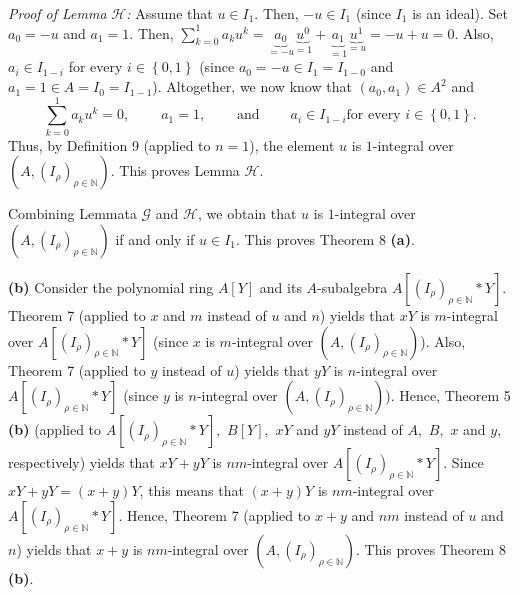 \documentclass[12pt,final,notitlepage,onecolumn]{article}%
\begin{document}
\textit{Proof of Lemma }$\mathcal{H}$\textit{:} Assume that $u\in I_{1}$.
Then, $-u\in I_{1}$ (since $I_{1}$ is an ideal). Set $a_{0}=-u$ and $a_{1}=1$.
Then, $\sum\limits_{k=0}^{1}a_{k}u^{k}=\underbrace{a_{0}}_{=-u}\underbrace
{u^{0}}_{=1}+\underbrace{a_{1}}_{=1}\underbrace{u^{1}}_{=u}=-u+u=0$. Also,
$a_{i}\in I_{1-i}$ for every $i\in\left\{  0,1\right\}  $ (since $a_{0}=-u\in
I_{1}=I_{1-0}$ and $a_{1}=1\in A=I_{0}=I_{1-1}$). Altogether, we now know that
$\left(  a_{0},a_{1}\right)  \in A^{2}$ and%
\[
\sum\limits_{k=0}^{1}a_{k}u^{k}=0,\ \ \ \ \ \ \ \ \ \ a_{1}%
=1,\ \ \ \ \ \ \ \ \ \ \text{and}\ \ \ \ \ \ \ \ \ \ a_{i}\in I_{1-i}\text{
for every }i\in\left\{  0,1\right\}  .
\]
Thus, by Definition 9 (applied to $n=1$), the element $u$ is $1$-integral over
$\left(  A,\left(  I_{\rho}\right)  _{\rho\in\mathbb{N}}\right)  $. This
proves Lemma $\mathcal{H}$.

Combining Lemmata $\mathcal{G}$ and $\mathcal{H}$, we obtain that $u$ is
$1$-integral over $\left(  A,\left(  I_{\rho}\right)  _{\rho\in\mathbb{N}%
}\right)  $ if and only if $u\in I_{1}$. This proves Theorem 8 \textbf{(a)}.

\textbf{(b)} Consider the polynomial ring $A\left[  Y\right]  $ and its
$A$-subalgebra $A\left[  \left(  I_{\rho}\right)  _{\rho\in\mathbb{N}}\ast
Y\right]  $. Theorem 7 (applied to $x$ and $m$ instead of $u$ and $n$) yields
that $xY$ is $m$-integral over $A\left[  \left(  I_{\rho}\right)  _{\rho
\in\mathbb{N}}\ast Y\right]  $ (since $x$ is $m$-integral over $\left(
A,\left(  I_{\rho}\right)  _{\rho\in\mathbb{N}}\right)  $). Also, Theorem 7
(applied to $y$ instead of $u$) yields that $yY$ is $n$-integral over
$A\left[  \left(  I_{\rho}\right)  _{\rho\in\mathbb{N}}\ast Y\right]  $ (since
$y$ is $n$-integral over $\left(  A,\left(  I_{\rho}\right)  _{\rho
\in\mathbb{N}}\right)  $). Hence, Theorem 5 \textbf{(b)} (applied to $A\left[
\left(  I_{\rho}\right)  _{\rho\in\mathbb{N}}\ast Y\right]  ,$ $B\left[
Y\right]  ,$ $xY$ and $yY$ instead of $A,$ $B,$ $x$ and $y$, respectively)
yields that $xY+yY$ is $nm$-integral over $A\left[  \left(  I_{\rho}\right)
_{\rho\in\mathbb{N}}\ast Y\right]  $. Since $xY+yY=\left(  x+y\right)  Y$,
this means that $\left(  x+y\right)  Y$ is $nm$-integral over $A\left[
\left(  I_{\rho}\right)  _{\rho\in\mathbb{N}}\ast Y\right]  $. Hence, Theorem
7 (applied to $x+y$ and $nm$ instead of $u$ and $n$) yields that $x+y$ is
$nm$-integral over $\left(  A,\left(  I_{\rho}\right)  _{\rho\in\mathbb{N}%
}\right)  $. This proves Theorem 8 \textbf{(b)}.
\end{document}
